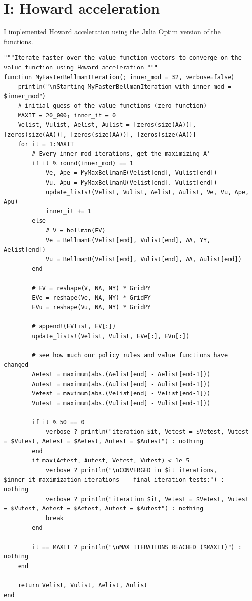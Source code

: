 \documentclass[12pt]{article}
\begin{document}
\newpage
\section*{I: Howard acceleration}

I implemented Howard acceleration using the Julia Optim version of the functions. 


\begin{lstlisting}[language=JuliaLocal, style=julia]
"""Iterate faster over the value function vectors to converge on the value function using Howard acceleration."""
function MyFasterBellmanIteration(; inner_mod = 32, verbose=false)
    println("\nStarting MyFasterBellmanIteration with inner_mod = $inner_mod")
    # initial guess of the value functions (zero function)
    MAXIT = 20_000; inner_it = 0
    Velist, Vulist, Aelist, Aulist = [zeros(size(AA))], [zeros(size(AA))], [zeros(size(AA))], [zeros(size(AA))]
    for it = 1:MAXIT
        # Every inner_mod iterations, get the maximizing A'
        if it % round(inner_mod) == 1
            Ve, Ape = MyMaxBellmanE(Velist[end], Vulist[end])
            Vu, Apu = MyMaxBellmanU(Velist[end], Vulist[end])
            update_lists!(Velist, Vulist, Aelist, Aulist, Ve, Vu, Ape, Apu)
            inner_it += 1
        else
            # V = bellman(EV)
            Ve = BellmanE(Velist[end], Vulist[end], AA, YY, Aelist[end])
            Vu = BellmanU(Velist[end], Vulist[end], AA, Aulist[end])
        end

        # EV = reshape(V, NA, NY) * GridPY
        EVe = reshape(Ve, NA, NY) * GridPY
        EVu = reshape(Vu, NA, NY) * GridPY

        # append!(EVlist, EV[:])
        update_lists!(Velist, Vulist, EVe[:], EVu[:])

        # see how much our policy rules and value functions have changed
        Aetest = maximum(abs.(Aelist[end] - Aelist[end-1]))
        Autest = maximum(abs.(Aulist[end] - Aulist[end-1]))
        Vetest = maximum(abs.(Velist[end] - Velist[end-1]))
        Vutest = maximum(abs.(Vulist[end] - Vulist[end-1]))
        
        if it % 50 == 0
            verbose ? println("iteration $it, Vetest = $Vetest, Vutest = $Vutest, Aetest = $Aetest, Autest = $Autest") : nothing
        end
        if max(Aetest, Autest, Vetest, Vutest) < 1e-5
            verbose ? println("\nCONVERGED in $it iterations, $inner_it maximization iterations -- final iteration tests:") : nothing
            verbose ? println("iteration $it, Vetest = $Vetest, Vutest = $Vutest, Aetest = $Aetest, Autest = $Autest") : nothing
            break
        end

        it == MAXIT ? println("\nMAX ITERATIONS REACHED ($MAXIT)") : nothing
    end

    return Velist, Vulist, Aelist, Aulist
end
\end{lstlisting}
\end{document}
